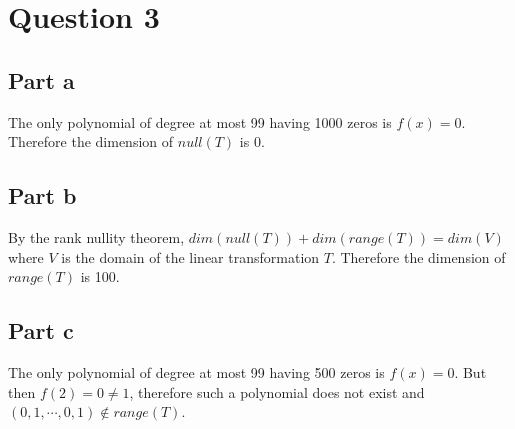 \section*{Question 3}
\subsection*{Part a}
The only polynomial of degree at most 99 having 1000 zeros is $ f(x) = 0 $. Therefore the dimension of $ null(T) $ is 0.
\subsection*{Part b}
By the rank nullity theorem, $ dim(null(T)) + dim(range(T)) = dim(V) $ where $ V $ is the domain of the linear transformation $ T $. Therefore the dimension of $ range(T) $ is 100.
\subsection*{Part c}
The only polynomial of degree at most 99 having 500 zeros is $ f(x) = 0 $. But then $ f(2) = 0 \ne 1 $, therefore such a polynomial does not exist and $ (0,1,\cdots,0,1) \notin range(T) $.